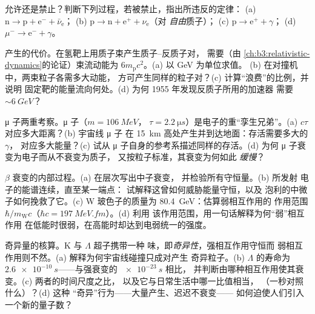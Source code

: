 \begin{exercise}[$\star$]\label{exo:b3:particle-physics:3}
允许还是禁止？判断下列过程，若被禁止，指出所违反的定律：
(a) $\text{n} \to \text{p} + \text{e}^- + \bar\nu_{\text{e}}$；
(b) $\text{p} \to \text{n} + \text{e}^+ + \nu_{\text{e}}$（对
\emph{自由}质子）；
(c) $\text{p} \to \text{e}^+ + \gamma$；
(d) $\mu^- \to \text{e}^- + \gamma$。
\end{exercise}

\begin{exercise}[$\star$]\label{exo:b3:particle-physics:4}
产生的代价。在氢靶上用质子束产生质子–反质子对，
需要（由
\cref{ch:b3:relativistic-dynamics}的论证）束流动能为
$6m_{\text{p}}c^2$。(a) 以 GeV 为单位求值。
(b) 在对撞机中，两束粒子各需多大动能，
方可产生同样的粒子对？(c) 计算“浪费”的比例，并说明
固定靶的能量流向何处。(d) 为何 1955 年发现反质子所用的加速器
需要 $\sim\qty{6}{GeV}$？
\end{exercise}

\begin{exercise}[$\star\star$]\label{exo:b3:particle-physics:5}
μ 子两重考察。μ 子（$m = \qty{106}{MeV}$，
$\tau = \qty{2.2}{\micro s}$）是电子的重“孪生兄弟”。(a)
$c\tau$ 对应多大距离？(b) 宇宙线 μ 子
在 \qty{15}{km} 高处产生并到达地面：存活需要多大的 $\gamma$，
对应多大能量？(c) 试从
μ 子自身的参考系描述同样的存活。(d) 为何 μ 子衰变为电子而从不衰变为质子，
又按粒子标准，其衰变为何如此
\emph{缓慢}？
\end{exercise}

\begin{exercise}[$\star\star$]\label{exo:b3:particle-physics:6}
$\beta$ 衰变的内部过程。(a) 在层次写出中子衰变，
并检验所有守恒量。(b) 所发射
电子的能谱连续，直至某一端点：
试解释这曾如何威胁能量守恒，以及
泡利的中微子如何挽救了它。(c) W 玻色子的质量为
\qty{80.4}{GeV}：估算弱相互作用的
作用范围 $\hbar/m_{\text{W}}c$（$\hbar c = \qty{197}{MeV.fm}$）。(d) 利用
该作用范围，用一句话解释为何“弱”相互作用
在低能时很弱，在高能时却达到电弱统一的强度。
\end{exercise}

\begin{exercise}[$\star\star$]\label{exo:b3:particle-physics:7}
奇异量的核算。K 与 $\Lambda$ 超子携带一种
味，即\emph{奇异性}，强相互作用守恒而
弱相互作用则不然。(a) 解释为何宇宙线碰撞只成对产生
奇异粒子。(b) $\Lambda$ 的寿命为
$\qty{2.6e-10}{s}$——与强衰变的 $\qty{e-23}{s}$ 相比，
并判断由哪种相互作用使其衰变。(c) 两者的时间尺度之比，
以及它与日常生活中哪一比值相当，
（一秒对照什么）？(d) 这种
“奇异”行为——大量产生、迟迟不衰变——
如何迫使人们引入一个新的量子数？
\end{exercise}

